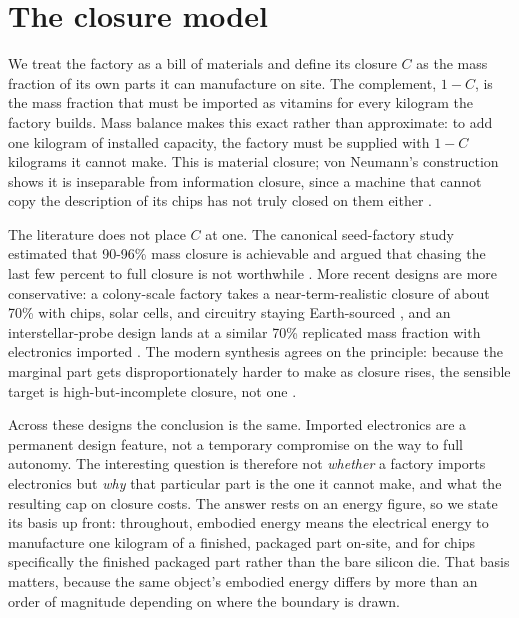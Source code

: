 \section{The closure model}

We treat the factory as a bill of materials and define its closure $C$ as the mass
fraction of its own parts it can manufacture on site. The complement, $1-C$, is the mass
fraction that must be imported as vitamins for every kilogram the factory builds. Mass
balance makes this exact rather than approximate: to add one kilogram of installed
capacity, the factory must be supplied with $1-C$ kilograms it cannot make. This is
material closure; von Neumann's construction shows it is inseparable from information
closure, since a machine that cannot copy the description of its chips has not truly closed
on them either \cite{von-neumann-burks-1966,freitas-merkle-2004}.

The literature does not place $C$ at one. The canonical seed-factory study estimated that
\mbox{90-96\%} mass closure is achievable and argued that chasing the last few percent to
full closure is not worthwhile \cite{nasa-cp-2255-1980}. More recent designs are more
conservative: a colony-scale factory takes a near-term-realistic closure of about 70\% with
chips, solar cells, and circuitry staying Earth-sourced
\cite{guided-self-replicating-factory-2021}, and an interstellar-probe design lands at a
similar 70\% replicated mass fraction with electronics imported \cite{borgue-hein-2020}.
The modern synthesis agrees on the principle: because the marginal part gets
disproportionately harder to make as closure rises, the sensible target is
high-but-incomplete closure, not one \cite{freitas-merkle-2004}.

Across these designs the conclusion is the same. Imported electronics are a permanent
design feature, not a temporary compromise on the way to full autonomy. The interesting
question is therefore not \emph{whether} a factory imports electronics but \emph{why} that
particular part is the one it cannot make, and what the resulting cap on closure costs. The
answer rests on an energy figure, so we state its basis up front: throughout, embodied
energy means the electrical energy to manufacture one kilogram of a finished, packaged part
on-site, and for chips specifically the finished packaged part rather than the bare silicon
die. That basis matters, because the same object's embodied energy differs by more than an
order of magnitude depending on where the boundary is drawn.
